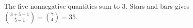 The five nonnegative quantities sum to $3$. Stars and bars gives $\binom{3+5-1}{5-1}=\binom74=\boxed{35}$.

